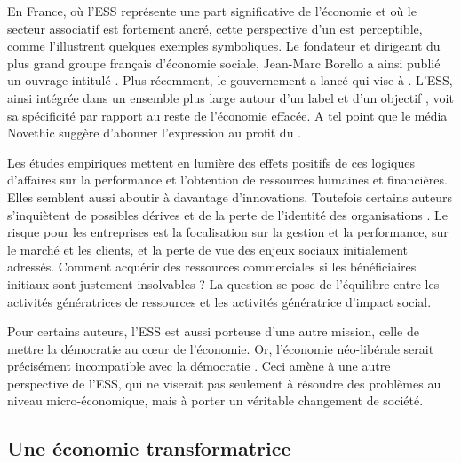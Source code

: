             En France, où l’ESS représente une part significative de l’économie et où le secteur associatif est fortement ancré, cette perspective d’un  est perceptible, comme l’illustrent quelques exemples symboliques. Le fondateur et dirigeant du plus grand groupe français d’économie sociale, Jean-Marc Borello a ainsi publié un ouvrage intitulé . Plus récemment, le gouvernement a lancé  qui vise à  \parencite{ministere_de_leducation_nationale2018lancement}. L’ESS, ainsi intégrée dans un ensemble plus large autour d’un label et d’un objectif , voit sa spécificité par rapport au reste de l’économie effacée. A tel point que le média Novethic suggère d’abonner l’expression  au profit du  \parencite{alvarez2018ne}.

            Les études empiriques mettent en lumière des effets positifs de ces logiques d’affaires sur la performance et l’obtention de ressources humaines et financières. Elles semblent aussi aboutir à davantage d’innovations. Toutefois certains auteurs s’inquiètent de possibles dérives \parencite{maier2016nonprofit} et de la perte de l’identité des organisations \parencite[p. 134]{laville2016economie}. Le risque pour les entreprises est la focalisation sur la gestion et la performance, sur le marché et les clients, et la perte de vue des enjeux sociaux initialement adressés. Comment acquérir des ressources commerciales si les bénéficiaires initiaux sont justement insolvables ? La question se pose de l’équilibre entre les activités génératrices de ressources et les activités génératrice d’impact social.

            Pour certains auteurs, l’ESS est aussi porteuse d’une autre mission, celle de mettre la démocratie au cœur de l’économie. Or, l’économie néo-libérale serait précisément incompatible avec la démocratie \parencite{defalvard2016leconomie}. Ceci amène à une autre perspective de l’ESS, qui ne viserait pas seulement à résoudre des problèmes au niveau micro-économique, mais à porter un véritable changement de société.

        \subsection{Une économie transformatrice }

